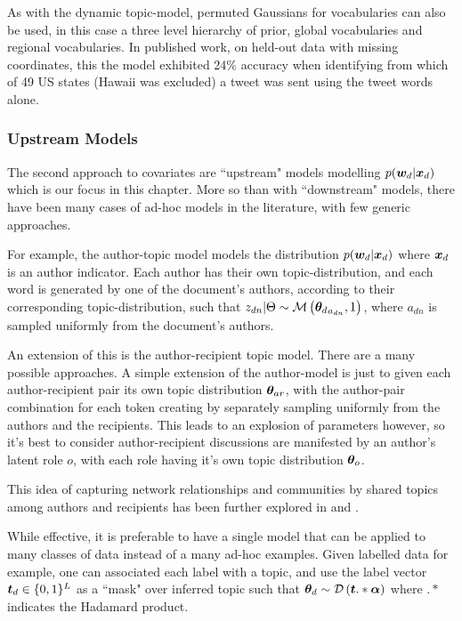 As with the dynamic topic-model, permuted Gaussians for vocabularies can also be used, in this case a three level hierarchy of prior, global vocabularies and regional vocabularies. In published work, on held-out data with missing coordinates, this the model exhibited 24\% accuracy when identifying from which of 49 US states (Hawaii was excluded) a tweet was sent using the tweet words alone.

\subsubsection{Upstream Models}
The second approach to covariates are ``upstream" models modelling $p({ \bm w_d } | { \bm x_d })$ which is our focus in this chapter. More so than with ``downstream" models, there have been many cases of ad-hoc models in the literature, with few generic approaches.

For example, the author-topic model\cite{RosenZvi2004} models the distribution $p({ \bm w_d } | { \bm x_d })$ where ${ \bm x_d }$ is an author indicator. Each author has their own topic-distribution, and each word is generated by one of the document's authors, according to their corresponding topic-distribution, such that $z_{dn} | \Theta \sim \mathcal{M} \left( {{ \bm \theta_d }_{a_{dn}}},{1} \right)$, where $a_{dn}$ is sampled uniformly from the document's authors.

An extension of this is the author-recipient topic model\cite{MacCallum2007}. There are a many possible approaches. A simple extension of the author-model is just to given each author-recipient pair its own topic distribution $\bm \theta_{ar}$, with the author-pair combination for each token creating by separately sampling uniformly from the authors and the recipients. This leads to an explosion of parameters however, so it's best to consider author-recipient discussions are manifested by an author's latent role $o$, with each role having it's own topic distribution $\bm \theta_o$.

This idea of capturing network relationships and communities by shared topics among authors and recipients has been further explored in \cite{Sachan2012} and \cite{Kang2013}.

While effective, it is preferable to have a single model that can be applied to many classes of data instead of a many ad-hoc examples. Given labelled data for example, one can associated each label with a topic, and use the label vector $\bm t_d \in \{0,1\}^L$ as a ``mask" over inferred topic such that ${ \bm \theta_d } \sim \mathcal{D} \left( {\bm t .* \bm \alpha} \right)$\cite{Ramage2009} where $.*$ indicates the Hadamard product.

